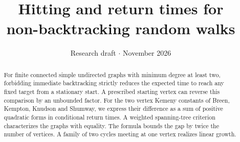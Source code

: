 \documentclass[11pt]{article}
\title{\textcolor{ink}{Hitting and return times for\texorpdfstring{\\}{ }non-backtracking random walks}}
\date{Research draft \enspace$\cdot$\enspace 26 November 2026}
\author{}
\begin{document}
\maketitle
\begin{abstract}
For finite connected simple undirected graphs with minimum degree at least two, forbidding immediate backtracking strictly reduces the expected time to reach any fixed target from a stationary start. A prescribed starting vertex can reverse this comparison by an unbounded factor. For the two vertex Kemeny constants of Breen, Kempton, Knudson and Shumway, we express their difference as a sum of positive quadratic forms in conditional return times. A weighted spanning-tree criterion characterizes the graphs with equality. The formula bounds the gap by twice the number of vertices. A family of two cycles meeting at one vertex realizes linear growth.
\end{abstract}
\end{document}
